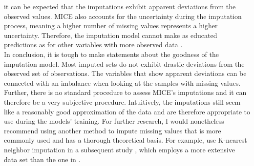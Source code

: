 it can be expected that the imputations exhibit apparent deviations from the 
observed values. MICE also accounts for the uncertainty during the imputation 
process, meaning a higher number of missing values represents a higher 
uncertainty. Therefore, the imputation model cannot make as educated 
predictions as for other variables with more observed data \cite{RN141, RN142}.
\\
In conclusion, it is tough to make statements about the goodness of the 
imputation model. Most imputed sets do not exhibit drastic deviations from the 
observed set of observations. The variables that show apparent 
deviations can be connected with an imbalance when looking at the samples with 
missing values. Further, there is no standard procedure to assess MICE's 
imputations and it can therefore be a very subjective procedure. Intuitively, 
the imputations still seem like a reasonably good approximation of the data and 
are therefore appropriate to use during the models' training.
For further research, I would nonetheless recommend using another method to 
impute missing values that is more commonly used and has a thorough theoretical 
basis. 
For example, \citeauthor{RN127} use K-nearest neighbor imputation in a 
subsequent study \cite{RN179}, which employs a more extensive data set than the 
one in \cite{RN127}.
